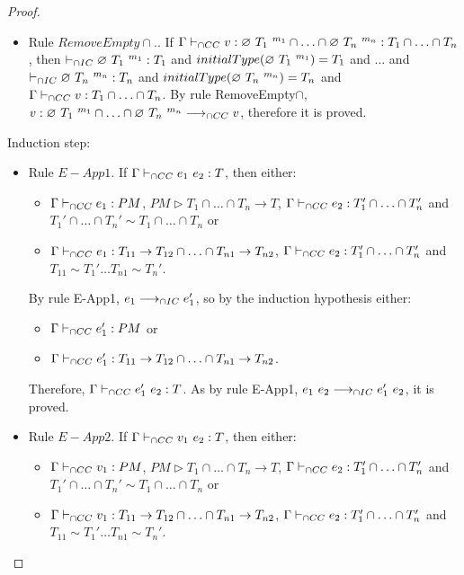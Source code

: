 \documentclass[a4paper]{article}
\begin{document}
\begin{proof}
\begin{itemize}
    \item Rule $RemoveEmpty{\cap}$..
    If $\Gamma \vdash_{\cap CC} v : \varnothing\ T_1\ ^{m_1} \cap \ldots \cap \varnothing\ T_n\ ^{m_n} : T_1 \cap \ldots \cap T_n$, then $\vdash_{\cap IC} \varnothing\ T_1\ ^{m_1} : T_1$ and $initialType(\varnothing\ T_1\ ^{m_1}) = T_1$ and ... and $\vdash_{\cap IC} \varnothing\ T_n\ ^{m_n} : T_n$ and $initialType(\varnothing\ T_n\ ^{m_n}) = T_n$ and $\Gamma \vdash_{\cap CC} v : T_1 \cap \ldots \cap T_n$.
    By rule RemoveEmpty$\cap$, $v : \varnothing\ T_1\ ^{m_1} \cap \ldots \cap \varnothing\ T_n\ ^{m_n} \longrightarrow_{\cap CC} v$, therefore it is proved.
\end{itemize}
Induction step:
\begin{itemize}
    \item Rule $E{-}App1$. If $\Gamma \vdash_{\cap CC} e_1\ e_2 : T$, then either:
    \begin{itemize}
        \item $\Gamma \vdash_{\cap CC} e_1 : PM$, $PM \rhd T_1 \cap \ldots \cap T_n \rightarrow T$, $\Gamma \vdash_{\cap CC} e_2 : T_1' \cap \ldots \cap T_n'$ and $T_1' \cap \ldots \cap T_n' \sim T_1 \cap \ldots \cap T_n$ or
        \item $\Gamma \vdash_{\cap CC} e_1 : T_{11} \rightarrow T_{12} \cap \ldots \cap T_{n1} \rightarrow T_{n2}$, $\Gamma \vdash_{\cap CC} e_2 : T_1' \cap \ldots \cap T_n'$ and $T_{11} \sim T_1' \ldots T_{n1} \sim T_n'$.
    \end{itemize}
    By rule E-App1, $e_1 \longrightarrow_{\cap IC} e_1'$, so by the induction hypothesis either:
    \begin{itemize}
        \item $\Gamma \vdash_{\cap CC} e_1' : PM$ or
        \item $\Gamma \vdash_{\cap CC} e_1' : T_{11} \rightarrow T_{12} \cap \ldots \cap T_{n1} \rightarrow T_{n2}$.
    \end{itemize}
    Therefore, $\Gamma \vdash_{\cap CC} e_1'\ e_2 : T$.
    As by rule E-App1, $e_1\ e_2 \longrightarrow_{\cap IC} e_1'\ e_2$, it is proved.
    \item Rule $E{-}App2$. If $\Gamma \vdash_{\cap CC} v_1\ e_2 : T$, then either:
    \begin{itemize}
        \item $\Gamma \vdash_{\cap CC} v_1 : PM$, $PM \rhd T_1 \cap \ldots \cap T_n \rightarrow T$, $\Gamma \vdash_{\cap CC} e_2 : T_1' \cap \ldots \cap T_n'$ and $T_1' \cap \ldots \cap T_n' \sim T_1 \cap \ldots \cap T_n$ or
        \item $\Gamma \vdash_{\cap CC} v_1 : T_{11} \rightarrow T_{12} \cap \ldots \cap T_{n1} \rightarrow T_{n2}$, $\Gamma \vdash_{\cap CC} e_2 : T_1' \cap \ldots \cap T_n'$ and $T_{11} \sim T_1' \ldots T_{n1} \sim T_n'$.
    \end{itemize}

\end{itemize}
\end{proof}
\end{document}
